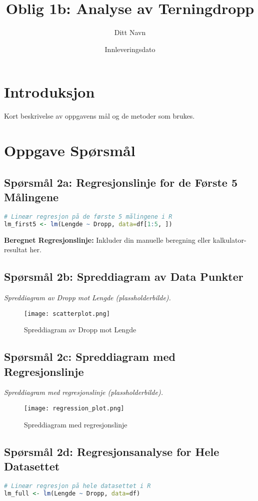 \documentclass{article}
\title{Oblig 1b: Analyse av Terningdropp}
\author{Ditt Navn}
\date{Innleveringsdato}
\begin{document}
\maketitle

\section{Introduksjon}
Kort beskrivelse av oppgavens mål og de metoder som brukes.

\section{Oppgave Spørsmål}

\subsection{Spørsmål 2a: Regresjonslinje for de Første 5 Målingene}
\begin{lstlisting}[language=R]
# Lineær regresjon på de første 5 målingene i R
lm_first5 <- lm(Lengde ~ Dropp, data=df[1:5, ])
\end{lstlisting}
\textbf{Beregnet Regresjonslinje:} Inkluder din manuelle beregning eller kalkulator-resultat her.

\subsection{Spørsmål 2b: Spreddiagram av Data Punkter}
\textit{Spreddiagram av Dropp mot Lengde (plassholderbilde).}
\begin{figure}[h]
    \centering
    \texttt{[image: scatterplot.png]}
    \caption{Spreddiagram av Dropp mot Lengde}
\end{figure}

\subsection{Spørsmål 2c: Spreddiagram med Regresjonslinje}
\textit{Spreddiagram med regresjonslinje (plassholderbilde).}
\begin{figure}[h]
    \centering
    \texttt{[image: regression\_plot.png]}
    \caption{Spreddiagram med regresjonslinje}
\end{figure}

\subsection{Spørsmål 2d: Regresjonsanalyse for Hele Datasettet}
\begin{lstlisting}[language=R]
# Lineær regresjon på hele datasettet i R
lm_full <- lm(Lengde ~ Dropp, data=df)
\end{lstlisting}
\end{document}
